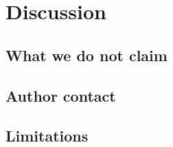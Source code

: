 \section{Discussion}
\label{sec:discussion}


\subsection{What we do not claim}
\label{sec:discussion:notclaim}


\subsection{Author contact}
\label{sec:discussion:contact}


\subsection{Limitations}
\label{sec:discussion:limits}

